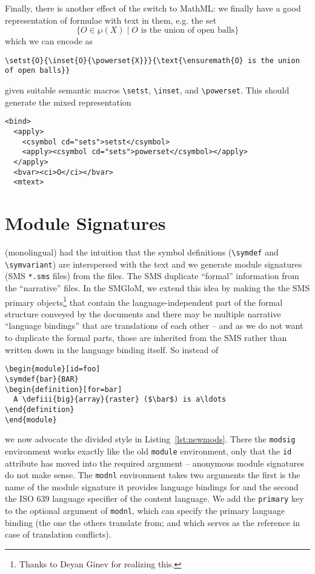 \documentclass{bluenote}
\def\smglom{\textsf{SMGloM}\xspace}
\begin{document}
Finally, there is another effect of the switch to MathML: we finally have a good
representation of formulae with text in them, e.g. the set 
\[\{O\in\wp(X)\mid O \text{ is the union of open balls}\}\]%
which we can encode as 
\begin{lstlisting}
\setst{O}{\inset{O}{\powerset{X}}}{\text{\ensuremath{O} is the union of open balls}}
\end{lstlisting}
given suitable semantic macros \lstinline|\setst|, \lstinline|\inset|, and
\lstinline|\powerset|. This should generate the mixed representation
\begin{lstlisting}[language=MathML]
<bind>
  <apply>
    <csymbol cd="sets">setst</csymbol>
    <apply><csymbol cd="sets">powerset</csymbol></apply>
  </apply>
  <bvar><ci>O</ci></bvar>
  <mtext>
\end{lstlisting}


\section{\protect\sTeX Module Signatures}

(monolingual) \sTeX had the intuition that the symbol definitions (\lstinline|\symdef| and
\lstinline|\symvariant|) are interspersed with the text and we generate \sTeX module
signatures (SMS \lstinline|*.sms| files) from the \sTeX files. The SMS duplicate
``formal'' information from the ``narrative'' \sTeX files. In the \smglom, we extend this
idea by making the the SMS primary objects\footnote{Thanks to Deyan Ginev for realizing
  this.} that contain the language-independent part of the formal structure conveyed by
the \sTeX documents and there may be multiple narrative ``language bindings'' that are
translations of each other -- and as we do not want to duplicate the formal parts, those
are inherited from the SMS rather than written down in the language binding itself. So instead of 
\begin{lstlisting}[caption=Old-Style \protect\sTeX,label=lst:oldmods]
\begin{module}[id=foo]
\symdef{bar}{BAR}
\begin{definition}[for=bar]
  A \defiii{big}{array}{raster} ($\bar$) is a\ldots
\end{definition}
\end{module}
\end{lstlisting}

we now advocate the divided style in Listing~\ref{lst:newmods}. There the \lstinline|modsig| environment works exactly like the old
\lstinline|module| environment, only that the \lstinline|id| attribute has moved into the
required argument -- anonymous module signatures do not make sense. The
\lstinline|modnl| environment takes two arguments the first is the name of the module
signature it provides language bindings for and the second the ISO 639 language specifier
of the content language. We add the \lstinline|primary| key to the optional argument of
\lstinline|modnl|, which can specify the primary language binding (the one the others
translate from; and which serves as the reference in case of translation conflicts).
\end{document}
